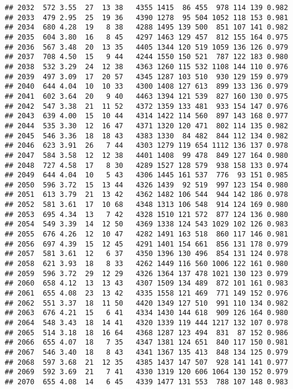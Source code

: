 \documentclass[]{article}
\begin{document}
\begin{verbatim}
## 2032  572 3.55  27  13 38   4355 1415  86 455  978 114 139 0.982
## 2033  479 2.95  25  19 36   4390 1278  95 504 1052 118 153 0.981
## 2034  680 4.28  19   8 38   4288 1495 139 500  851 107 141 0.982
## 2035  604 3.80  16   8 45   4297 1463 129 457  812 155 164 0.975
## 2036  567 3.48  20  13 35   4405 1344 120 519 1059 136 126 0.979
## 2037  708 4.50  15   9 44   4244 1550 150 521  787 122 183 0.980
## 2038  532 3.29  24  12 38   4363 1260 115 532 1108 144 110 0.976
## 2039  497 3.09  17  20 57   4345 1287 103 510  930 129 159 0.979
## 2040  644 4.04  10  10 33   4300 1408 127 613  899 133 136 0.979
## 2041  602 3.64  20   9 40   4463 1394 121 539  827 160 130 0.975
## 2042  547 3.38  21  11 52   4372 1359 133 481  933 154 147 0.976
## 2043  639 4.00  15  10 44   4314 1422 114 560  897 143 168 0.977
## 2044  535 3.30  12  16 47   4371 1320 120 471  802 114 135 0.982
## 2045  546 3.36  18  18 43   4383 1330  84 482  844 112 134 0.982
## 2046  623 3.91  26   7 44   4303 1279 119 654 1112 136 137 0.978
## 2047  584 3.58  12  12 38   4401 1408  99 478  849 127 164 0.980
## 2048  727 4.58  17   8 30   4289 1527 128 579  938 158 133 0.974
## 2049  644 4.04  10   5 43   4306 1445 161 537  776  93 151 0.985
## 2050  596 3.72  15  13 44   4326 1439  92 519  997 123 154 0.980
## 2051  613 3.79  21  13 42   4362 1482 106 544  944 142 186 0.978
## 2052  581 3.61  17  10 68   4348 1313 106 548  914 124 169 0.980
## 2053  695 4.34  13   7 42   4328 1510 121 572  877 124 136 0.980
## 2054  549 3.39  14  12 50   4369 1338 124 543 1029 102 126 0.983
## 2055  676 4.26  12  10 47   4282 1491 163 518  860 117 146 0.981
## 2056  697 4.39  15  12 45   4291 1401 154 661  856 131 178 0.979
## 2057  581 3.61  12   6 37   4350 1396 130 496  854 131 124 0.978
## 2058  621 3.93  18   8 33   4262 1449 116 560 1006 122 161 0.980
## 2059  596 3.72  29  12 29   4326 1364 137 478 1021 130 123 0.979
## 2060  658 4.12  13  13 43   4307 1509 134 489  872 101 161 0.983
## 2061  655 4.08  23  13 42   4335 1558 121 469  771 149 152 0.976
## 2062  551 3.37  18  11 50   4420 1349 127 510  991 110 134 0.982
## 2063  676 4.21  15   6 41   4334 1430 144 618  909 126 164 0.980
## 2064  548 3.43  18  14 41   4320 1339 119 444 1217 132 107 0.978
## 2065  514 3.18  18  16 64   4368 1287 123 494  831  87 152 0.986
## 2066  655 4.07  18   7 35   4347 1381 124 651  840 117 150 0.981
## 2067  546 3.40  18   8 43   4341 1367 135 413  848 134 125 0.979
## 2068  597 3.68  21  12 35   4385 1437 147 507  928 141 141 0.977
## 2069  592 3.69  21   7 41   4330 1319 120 606 1064 130 152 0.979
## 2070  655 4.08  14   6 45   4339 1477 131 553  788 107 148 0.983

\end{verbatim}
\end{document}

